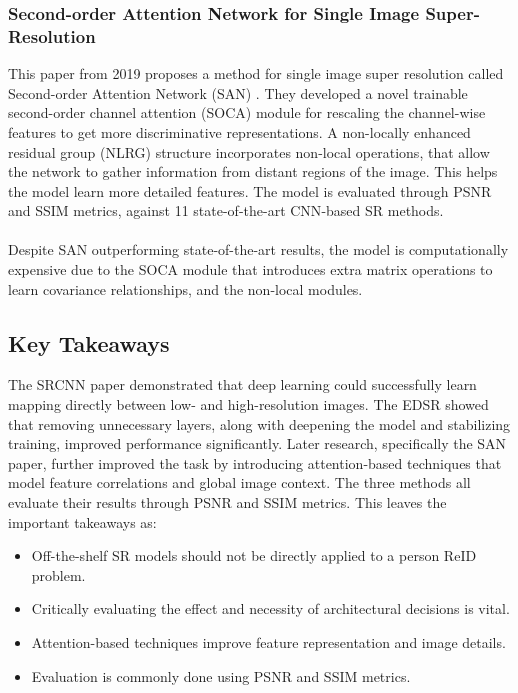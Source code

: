 \subsubsection{Second-order Attention Network for Single Image Super-Resolution}
This paper from 2019 proposes a method for single image super resolution called Second-order Attention Network (SAN) \cite{SAN}. They developed a novel trainable second-order channel attention (SOCA) module for rescaling the channel-wise features to get more discriminative representations. A non-locally enhanced residual group (NLRG) structure incorporates non-local operations, that allow the network to gather information from distant regions of the image. This helps the model learn more detailed features. The model is evaluated through \acs{PSNR} and \acs{SSIM} metrics, against 11 state-of-the-art \acs{CNN}-based \acs{SR} methods. 
\\\\
Despite SAN outperforming state-of-the-art results, the model is computationally expensive due to the SOCA module that introduces extra matrix operations to learn covariance relationships, and the non-local modules. 

\subsection{Key Takeaways}
The \acs{SRCNN} paper demonstrated that deep learning could successfully learn mapping directly between low- and high-resolution images. The \acs{EDSR} showed that removing unnecessary layers, along with deepening the model and stabilizing training, improved performance significantly. Later research, specifically the SAN paper, further improved the task by introducing attention-based techniques that model feature correlations and global image context. The three methods all evaluate their results through PSNR and SSIM metrics. This leaves the important takeaways as:

\begin{itemize}
    \item Off-the-shelf \acs{SR} models should not be directly applied to a person \acs{ReID} problem.
    \item Critically evaluating the effect and necessity of architectural decisions is vital.  
    \item Attention-based techniques improve feature representation and image details. 
    \item Evaluation is commonly done using \acs{PSNR} and \acs{SSIM} metrics.
\end{itemize}


